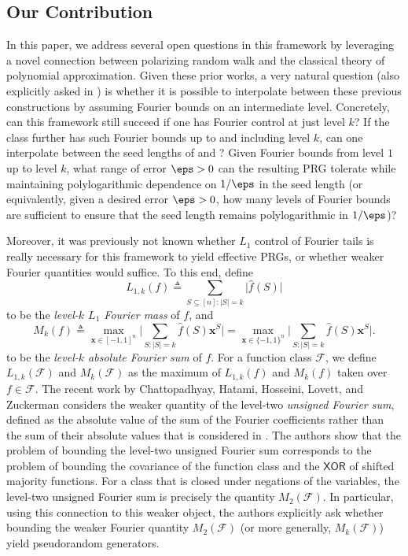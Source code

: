 \subsection{Our Contribution}\label{intro:results}
{In this paper, we address several open questions in this framework by leveraging a novel connection between polarizing random walk and the classical theory of polynomial approximation.} Given these {prior} works, a very natural question (also explicitly asked in \cite{CHLT}) is whether it is possible to interpolate between these {previous} constructions by assuming Fourier bounds on an intermediate level. Concretely, can this framework still succeed if one has Fourier control at just level $k$? If the class further has such Fourier bounds up to and including level $k$, can one interpolate between the seed lengths of \cite{CHHL} and \cite{CHLT}? Given Fourier bounds from level $1$ up to level $k$, what range of error $\eps>0$ can the resulting PRG tolerate while maintaining polylogarithmic dependence on $1/\eps$ in the seed length (or equivalently, given a desired error $\eps>0$, how many levels of Fourier bounds are sufficient to ensure that the seed length remains polylogarithmic in $1/\eps$)?

Moreover, {it was previously not known whether $L_1$ control of Fourier tails is really necessary for this framework to yield effective PRGs, or whether weaker Fourier quantities would suffice. To this end, define
\begin{equation*}
    L_{1,k}(f)\triangleq \sum_{S\subseteq [n]:\vert S\vert=k} \vert \hat{f}(S)\vert
\end{equation*}
to be the \emph{level-$k$ $L_1$ Fourier mass} of $f$, and 
\begin{equation*}
    M_k(f)\triangleq \max_{\mathbf{x}\in [-1,1]^n}\bigg\vert \sum_{S:\vert S\vert=k} \hat{f}(S)\mathbf{x}^S\bigg\vert =  \max_{\mathbf{x}\in \{-1,1\}^n}\bigg\vert \sum_{S:\vert S\vert=k} \hat{f}(S)\mathbf{x}^S\bigg\vert .
\end{equation*}
to be the \emph{level-$k$ absolute Fourier sum} of $f$.
For a function class $\mathcal{F}$, we define $L_{1,k}(\mathcal{F})$ and $M_k( \mathcal{F} )$ as the maximum of $L_{1,k}(f)$ and $M_k(f)$ taken over $f\in \mathcal{F}$.}  The recent work by Chattopadhyay, Hatami, Hosseini, Lovett, and Zuckerman \cite{xorlemma} considers the weaker quantity of the level-two {\em unsigned Fourier sum}, defined as the absolute value of the sum of the Fourier coefficients rather than the sum of their absolute values that is considered in \cite{CHHL,CHLT}.  The authors show that the problem of bounding the level-two unsigned Fourier sum corresponds to the problem of bounding the covariance of the function class and the $\mathsf{XOR}$ of shifted majority functions. {For a class that is closed under negations of the variables, the level-two unsigned Fourier sum is precisely the quantity $M_2(\mathcal{F})$.} In particular, using this connection to this weaker object, the authors explicitly ask whether bounding the weaker Fourier quantity $M_2(\mathcal{F})$ (or more generally, $M_k(\mathcal{F})$) yield pseudorandom generators.

